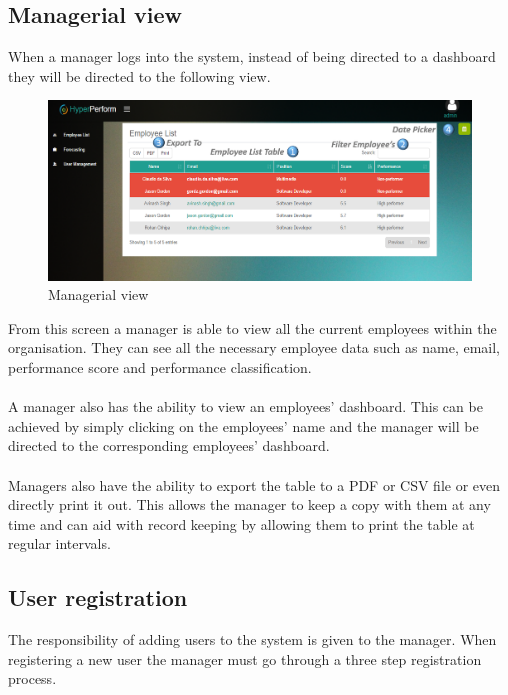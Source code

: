 \documentclass[11pt,a4paper]{article}
\begin{document}
\subsection{Managerial view}
When a manager logs into the system, instead of being directed to a dashboard they will be directed to the following view.

\begin{figure}[H]
	\begin{center}
		\includegraphics[width=\linewidth]{../Images/Getting_Started/Man_page_numbered}
		\caption{Managerial view}
	\end{center}
\end{figure}

\noindent
From this screen a manager is able to view all the current employees within the organisation. They can see all the necessary employee data such as name, email, performance score and performance classification. \\ \\ 
\noindent
A manager also has the ability to view an employees' dashboard. This can be achieved by simply clicking on the employees' name and the manager will be directed to the corresponding employees' dashboard. \\ \\
\noindent
Managers also have the ability to export the table to a PDF or CSV file or even directly print it out. This allows the manager to keep a copy with them at any time and can aid with record keeping by allowing them to print the table at regular intervals.

\subsection{User registration}
The responsibility of adding users to the system is given to the manager. When registering a new user the manager must go through a three step registration process.
\end{document}
